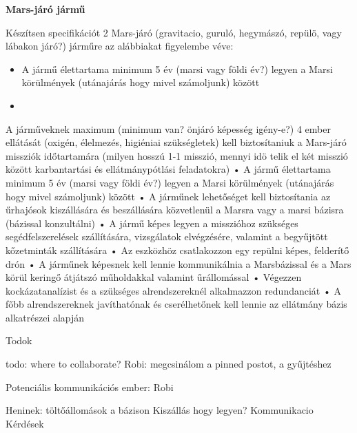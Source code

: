 \documentclass[12pt]{report}
\begin{document}
\begin{itemize}
\begin{itemize}
\end{itemize}                  









\textbf{Mars-járó jármű}

Készítsen specifikációt 2 Mars-járó (gravitacio, guruló, hegymászó, repülö, vagy lábakon járó?) járműre az alábbiakat figyelembe véve:

\begin{itemize}
    \item A jármű élettartama minimum 5 év (marsi vagy földi év?) legyen a Marsi körülmények (utánajárás hogy mivel számoljunk) között
    \item 
\end{itemize}

A járműveknek maximum (minimum van? önjáró képesség igény-e?) 4 ember ellátását (oxigén, élelmezés, higiéniai szükségletek) kell biztosítaniuk a Mars-járó missziók időtartamára (milyen hosszú 1-1 misszió, mennyi idö telik el két misszió között karbantartási és ellátmánypótlási feladatokra)
• A jármű élettartama minimum 5 év (marsi vagy földi év?) legyen a Marsi körülmények (utánajárás hogy mivel számoljunk) között
• A járműnek lehetőséget kell biztosítania az űrhajósok kiszállására és beszállására
közvetlenül a Marsra vagy a marsi bázisra (bázissal konzultálni)
• A jármű képes legyen a misszióhoz szükséges segédfelszerelések szállítására, vizsgálatok
elvégzésére, valamint a begyűjtött kőzetminták szállítására
• Az eszközhöz csatlakozzon egy repülni képes, felderítő drón
• A járműnek képesnek kell lennie kommunikálnia a Marsbázissal és a Mars körül keringő
átjátszó műholdakkal valamint űrállomással
• Végezzen kockázatanalízist és a szükséges alrendszereknél alkalmazzon redundanciát
• A főbb alrendszereknek javíthatónak és cserélhetőnek kell lennie az ellátmány bázis
alkatrészei alapján

Todok

todo: where to collaborate? 
Robi: megcsinálom a pinned postot, a gyűjtéshez

Potenciális kommunikációs ember: Robi


Heninek: 
töltőállomások a bázison
Kiszállás hogy legyen?
Kommunikacio
Kérdések


\end{itemize}
\end{document}
